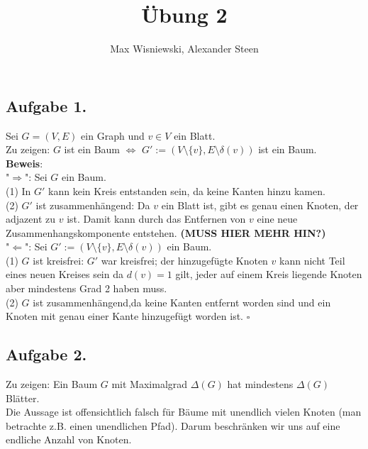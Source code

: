 \documentclass[11pt,a4paper,ngerman]{article}
\date{}
\title{Übung 2}
\author{Max Wisniewski, Alexander Steen}
\begin{document}

\renewcommand{\figurename}{Figure}

\maketitle
\thispagestyle{fancy}

\subsection*{Aufgabe 1.}
Sei $G = (V,E)$ ein Graph und $v \in V$ ein Blatt. \\
Zu zeigen: $G$ ist ein Baum $\Leftrightarrow$ $G' := (V \setminus \{v \}, E \setminus \delta(v))$ ist ein Baum. \\
\textbf{Beweis}:\\
"$\Rightarrow$": Sei $G$ ein Baum.\\
(1) In $G'$ kann kein Kreis entstanden sein, da keine Kanten hinzu kamen.\\
(2) $G'$ ist zusammenhängend: Da $v$ ein Blatt ist, gibt es genau einen Knoten, der adjazent zu $v$ ist.
Damit kann durch das Entfernen von $v$ eine neue Zusammenhangskomponente entstehen. 
\textbf{(MUSS HIER MEHR HIN?)}\\
"$\Leftarrow$": Sei $G' := (V \setminus \{v \}, E \setminus \delta(v))$ ein Baum. \\
(1) $G$ ist kreisfrei: $G'$ war kreisfrei; der hinzugefügte Knoten $v$ kann nicht Teil eines
neuen Kreises sein da $d(v)=1$ gilt, jeder auf einem Kreis liegende Knoten aber mindestens Grad 2 haben muss.\\
(2) $G$ ist zusammenhängend,da keine Kanten entfernt worden sind und ein Knoten mit genau einer Kante hinzugefügt worden ist.
\mbox{}\hfill$\square$

\subsection*{Aufgabe 2.}
Zu zeigen: Ein Baum $G$ mit Maximalgrad $\Delta(G)$ hat mindestens $\Delta(G)$ Blätter.\\
Die Aussage ist offensichtlich falsch für Bäume mit unendlich vielen Knoten (man betrachte z.B.
einen unendlichen Pfad). Darum beschränken wir uns auf eine endliche Anzahl von Knoten.
\end{document}

